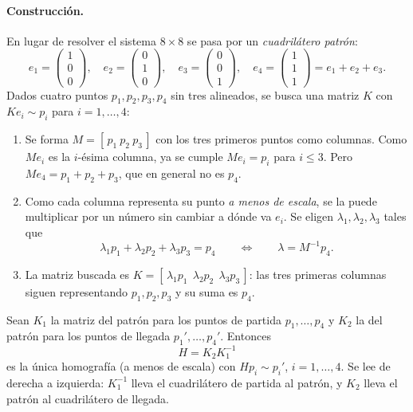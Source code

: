\paragraph{Construcción.} En lugar de resolver el sistema \(8\times8\) se pasa por un
\emph{cuadrilátero patrón}:
\[
  e_1=\begin{pmatrix}1\\0\\0\end{pmatrix},\quad
  e_2=\begin{pmatrix}0\\1\\0\end{pmatrix},\quad
  e_3=\begin{pmatrix}0\\0\\1\end{pmatrix},\quad
  e_4=\begin{pmatrix}1\\1\\1\end{pmatrix}=e_1+e_2+e_3 .
\]
Dados cuatro puntos \(p_1,p_2,p_3,p_4\) sin tres alineados, se busca una matriz \(K\) con
\(Ke_i\sim p_i\) para \(i=1,\dots,4\):
\begin{enumerate}
  \item Se forma \(M=[\,p_1\ p_2\ p_3\,]\) con los tres primeros puntos como columnas. Como
  \(Me_i\) es la \(i\)-ésima columna, ya se cumple \(Me_i=p_i\) para \(i\le3\). Pero
  \(Me_4=p_1+p_2+p_3\), que en general no es \(p_4\).
  \item Como cada columna representa su punto \emph{a menos de escala}, se la puede
  multiplicar por un número sin cambiar a dónde va \(e_i\). Se eligen \(\lambda_1,\lambda_2,
  \lambda_3\) tales que
  \[
    \lambda_1p_1+\lambda_2p_2+\lambda_3p_3=p_4
    \qquad\Longleftrightarrow\qquad
    \lambda=M^{-1}p_4 .
  \]
  \item La matriz buscada es \(K=[\,\lambda_1p_1\ \ \lambda_2p_2\ \ \lambda_3p_3\,]\):
  las tres primeras columnas siguen representando \(p_1,p_2,p_3\) y su suma es \(p_4\).
\end{enumerate}

\begin{resultado}
Sean \(K_1\) la matriz del patrón para los puntos de partida \(p_1,\dots,p_4\) y \(K_2\) la
del patrón para los puntos de llegada \(p_1',\dots,p_4'\). Entonces
\[
  \boxed{H=K_2K_1^{-1}}
\]
es la única homografía (a menos de escala) con \(Hp_i\sim p_i'\), \(i=1,\dots,4\).
Se lee de derecha a izquierda: \(K_1^{-1}\) lleva el cuadrilátero de partida al patrón, y
\(K_2\) lleva el patrón al cuadrilátero de llegada.
\end{resultado}

